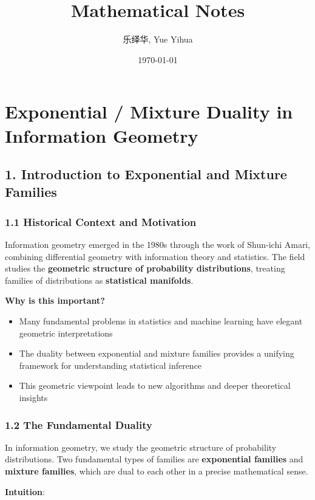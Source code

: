 \documentclass{amsart}
\author{乐绎华, Yue Yihua}
\date{\today}
\title{Mathematical Notes}
\theoremstyle{plain}
\theoremstyle{definition}
\theoremstyle{remark}
\begin{document}
\maketitle
\tableofcontents

\section{Exponential / Mixture Duality in Information Geometry}

\subsection{1. Introduction to Exponential and Mixture Families}

\subsubsection{1.1 Historical Context and Motivation}

Information geometry emerged in the 1980s through the work of Shun-ichi Amari, combining differential geometry with information theory and statistics. The field studies the \textbf{geometric structure of probability distributions}, treating families of distributions as \textbf{statistical manifolds}.

\textbf{Why is this important?}

\begin{itemize}
	\item Many fundamental problems in statistics and machine learning have elegant geometric interpretations
	\item The duality between exponential and mixture families provides a unifying framework for understanding statistical inference
	\item This geometric viewpoint leads to new algorithms and deeper theoretical insights
\end{itemize}

\subsubsection{1.2 The Fundamental Duality}

In information geometry, we study the geometric structure of probability distributions. Two fundamental types of families are \textbf{exponential families} and \textbf{mixture families}, which are dual to each other in a precise mathematical sense.

\textbf{Intuition}:
\end{document}
